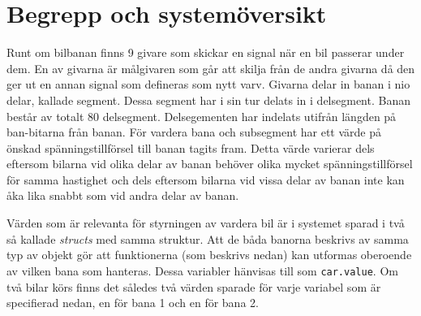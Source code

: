 \section{Begrepp och systemöversikt}

Runt om bilbanan finns 9 givare som skickar en signal när
en bil passerar under dem. En av givarna är målgivaren som går att skilja från de andra givarna då den ger ut en annan signal som defineras som nytt varv. Givarna delar in banan i nio delar, kallade segment. Dessa segment har i sin tur delats in i delsegment. Banan består av totalt 80 delsegment. Delsegementen har indelats utifrån längden på ban-bitarna från banan.
För vardera bana och subsegment har ett värde på önskad spänningstillförsel till
banan tagits fram. Detta värde varierar dels eftersom bilarna vid olika delar av
banan behöver olika mycket spänningstillförsel för samma hastighet och dels
eftersom bilarna vid vissa delar av banan inte kan åka lika snabbt som vid andra
delar av banan.

Värden som är relevanta för styrningen av vardera bil är i systemet sparad i
två så kallade \emph{structs} med samma struktur. Att de båda banorna beskrivs
av samma typ av objekt gör att funktionerna (som beskrivs nedan) kan utformas
oberoende av vilken bana som hanteras. Dessa variabler hänvisas till som
\texttt{car.value}. Om två bilar körs finns det således två värden sparade för
varje variabel som är specifierad nedan, en för bana 1 och en för bana 2.

